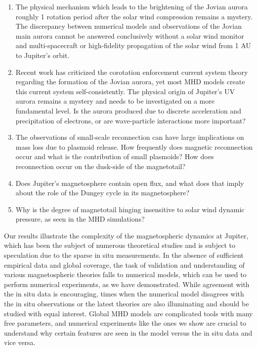 \begin{enumerate}
    \item The physical mechanism which leads to the brightening of the Jovian aurora roughly 1 rotation period after the solar wind compression remains a mystery. The discrepancy between numerical models and observations of the Jovian main aurora cannot be answered conclusively without a solar wind monitor and multi-spacecraft or high-fidelity propagation of the solar wind from 1 AU to Jupiter's orbit.
    
    \item Recent work has criticized the corotation enforcement current system theory \cite{Bonfond2020SixJupiter} regarding the formation of the Jovian aurora, yet most MHD models create this current system self-consistently. The physical origin of Jupiter's UV aurora remains a mystery and needs to be investigated on a more fundamental level. Is the aurora produced due to discrete acceleration and precipitation of electrons, or are wave-particle interactions more important?
    
    \item The observations of small-scale reconnection can have large implications on mass loss due to plasmoid release. How frequently does magnetic reconnection occur and what is the contribution of small plasmoids? How does reconnection occur on the dusk-side of the magnetotail?
    
    \item Does Jupiter's magnetosphere contain open flux, and what does that imply about the role of the Dungey cycle in its magnetosphere?
    
    \item Why is the degree of magnetotail hinging insensitive to solar wind dynamic pressure, as seen in the MHD simulations? 
\end{enumerate}

Our results illustrate the complexity of the magnetospheric dynamics at Jupiter, which has been the subject of numerous theoretical studies and is subject to speculation due to the sparse in situ measurements. In the absence of sufficient empirical data and global coverage, the task of validation and understanding of various magnetospheric theories falls to numerical models, which can be used to perform numerical experiments, as we have demonstrated. While agreement with the in situ data is encouraging, times when the numerical model disagrees with the in situ observations or the latest theories are also illuminating and should be studied with equal interest. Global MHD models are complicated tools with many free parameters, and numerical experiments like the ones we show are crucial to understand why certain features are seen in the model versus the in situ data and vice versa. 

